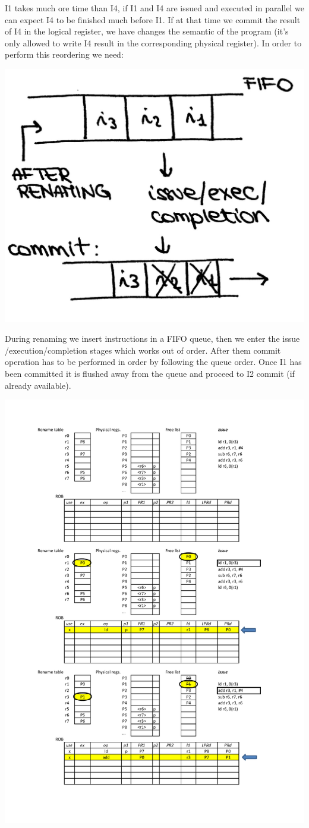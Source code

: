 I1 takes much ore time than I4, if I1 and I4 are issued and executed in parallel we can expect I4 to be finished much before I1. If at that time we commit the result of I4 in the logical register, we have changes the semantic of the program (it's only allowed to write I4 result in the corresponding physical register). In order to perform this reordering we need:
\begin{center}
  \includegraphics[width=0.5\linewidth]{img/img3/28}
\end{center}

During renaming we insert instructions in a FIFO queue, then we enter the issue /execution/completion stages which works out of order. After them commit operation has to be performed in order by following the queue order. Once I1 has been committed it is flushed away from the queue and proceed to I2 commit (if already available).

\begin{center}
  \includegraphics[width=1.1\linewidth]{img/img3/rob_example}
\end{center}


